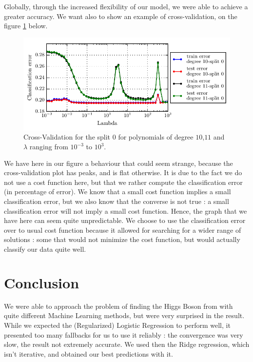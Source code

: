 \documentclass[10pt,conference,compsocconf]{IEEEtran}
\begin{document}
Globally, through the increased flexibility of our model, we were able to achieve a greater accuracy. We want also to show an example of cross-validation, on the figure \ref{fig:cross-validation} below.

\begin{figure}[!ht]
	\centering
	\includegraphics[scale=.7]{Cross_validation_10_11}
	\caption{Cross-Validation for the split $0$ for polynomials of degree $10$,$11$ and $\lambda$ ranging from $10^{-3}$ to $10^3$.}
	\label{fig:cross-validation}
\end{figure}

We have here in our figure a behaviour that could seem strange, because the cross-validation plot has peaks, and is flat otherwise. It is due to the fact we do not use a cost function here, but that we rather compute the classification error (in percentage of error). We know that a small cost function implies a small classification error, but we also know that the converse is not true : a small classification error will not imply a small cost function. Hence, the graph that we have here can seem quite unpredictable. We choose to use the classification error over to usual cost function because it allowed for searching for a wider range of solutions : some that would not minimize the cost function, but would actually classify our data quite well.
\section{Conclusion}
We were able to approach the problem of finding the Higgs Boson from with quite different Machine Learning methods, but were very surprised in the result. While we expected the (Regularized) Logistic Regression to perform well, it presented too many fallbacks for us to use it reliably : the convergence was very slow, the result not extremely accurate. We used then the Ridge regression, which isn't iterative, and obtained our best predictions with it.
\end{document}
